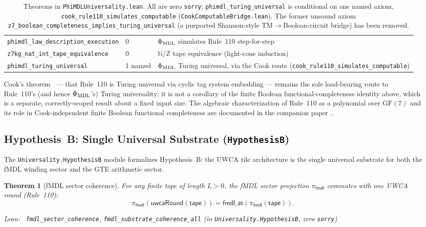 \documentclass[11pt,a4paper]{article}
\newenvironment{leanref}%
  {\par\smallskip\noindent\begingroup\raggedright\textup{Lean:}~}%
  {\par\endgroup}
\newtheorem{theorem}{Theorem}[section]
\theoremstyle{definition}
\begin{document}
\begin{table}[h]
\begin{tabular}{@{}p{6.5cm}p{1.8cm}p{6.7cm}@{}}
\lstinline|phimdl_law_description_execution| & 0 & $\Phi_{\rm MDL}$ simulates Rule~110 step-for-step \\
\lstinline|z7kg_nat_int_tape_equivalence| & 0 & $\mathbb{N}/\mathbb{Z}$ tape equivalence (light-cone induction) \\
\lstinline|phimdl_turing_universal| & 1 named & $\Phi_{\rm MDL}$ Turing universal, via the Cook route (\lstinline|cook_rule110_simulates_computable|) \\
\bottomrule
\end{tabular}
\caption{Theorems in \texttt{PhiMDLUniversality.lean}.  All are zero \texttt{sorry};
\lstinline|phimdl_turing_universal| is conditional on one named axiom,
\lstinline|cook_rule110_simulates_computable| (\texttt{CookComputableBridge.lean}).
The former unsound axiom \lstinline|z7_boolean_completeness_implies_turing_universal|
(a purported Shannon-style TM$\to$Boolean-circuit bridge) has been removed.}
\label{tab:phimdl-universality}
\end{table}

Cook's theorem~\cite{Cook2004,Wolfram1984} --- that Rule~110 is Turing universal via cyclic
tag system embedding --- remains the sole load-bearing route to Rule~110's (and hence
$\Phi_{\rm MDL}$'s) Turing universality; it is not a corollary of the finite Boolean
functional-completeness identity above, which is a separate, correctly-scoped result about
a fixed input size.
The algebraic characterization of Rule~110 as a polynomial over $\text{GF}(7)$ and its role
in Cook-independent finite Boolean functional completeness are documented in the companion
paper~\cite{SpivackGF7Universality}.

\subsection{Hypothesis~B: Single Universal Substrate (\texttt{HypothesisB})}\label{subsec:hypothesis-b}

The \texttt{Universality.HypothesisB} module formalizes Hypothesis~B: the UWCA tile
architecture is the single universal substrate for both the fMDL winding sector and
the GTE arithmetic sector.

\begin{theorem}[fMDL sector coherence]\label{thm:fmdl-sector-coherence}
For any finite tape of length $L > 0$, the fMDL sector projection $\pi_{\mathsf{fmdl}}$
commutes with one UWCA round (Rule~110):
\[
  \pi_{\mathsf{fmdl}}(\mathsf{uwcaRound}(\mathsf{tape}))
  = \mathsf{fmdl\_at}(\pi_{\mathsf{fmdl}}(\mathsf{tape})).
\]

\begin{leanref}
\lstinline|fmdl_sector_coherence|, \lstinline|fmdl_substrate_coherence_all|
\textup{(in \texttt{Universality.HypothesisB}, zero \texttt{sorry})}
\end{leanref}
\end{theorem}
\end{document}
